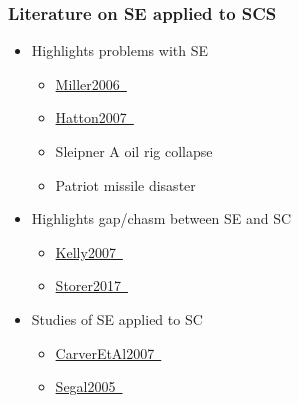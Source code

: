 \documentclass[t,12pt,numbers,fleqn]{beamer}
\begin{document}
\begin{frame}
\frametitle{Literature on SE applied to SCS}

\begin {itemize}

\item Highlights problems with SE
\begin{itemize}
\item
  \href{https://gitlab.cas.mcmaster.ca/smiths/cas741/blob/master/ReferenceMaterial/Miller2006.pdf}
  {Miller2006~\cite{Miller2006}}
\item
  \href{https://gitlab.cas.mcmaster.ca/smiths/cas741/blob/master/ReferenceMaterial/Hatton2007.pdf}
  {Hatton2007~\cite{Hatton2007}}
\item Sleipner A oil rig collapse~\cite[p.~38]{OliveiraAndStewart2006}
\item Patriot missile disaster~\cite[p.~36]{OliveiraAndStewart2006}
\end{itemize}
\item Highlights gap/chasm between SE and SC
\begin{itemize}
\item
  \href{https://gitlab.cas.mcmaster.ca/smiths/cas741/blob/master/ReferenceMaterial/Kelly2007.pdf}
  {Kelly2007~\cite{Kelly2007}}
\item
  \href{https://gitlab.cas.mcmaster.ca/smiths/cas741/blob/master/ReferenceMaterial/Storer2017.pdf}
  {Storer2017~\cite{Storer2017}}
\end{itemize}
\item Studies of SE applied to SC
\begin{itemize}
\item
  \href{https://gitlab.cas.mcmaster.ca/smiths/cas741/blob/master/ReferenceMaterial/CarverEtAl2007.pdf}
  {CarverEtAl2007~\cite{CarverEtAl2007}}
\item
  \href{https://gitlab.cas.mcmaster.ca/smiths/cas741/blob/master/ReferenceMaterial/Segal2005.pdf}
  {Segal2005~\cite{Segal2005}}
\end{itemize}

\end{itemize}

\end{frame}

\end{document}
